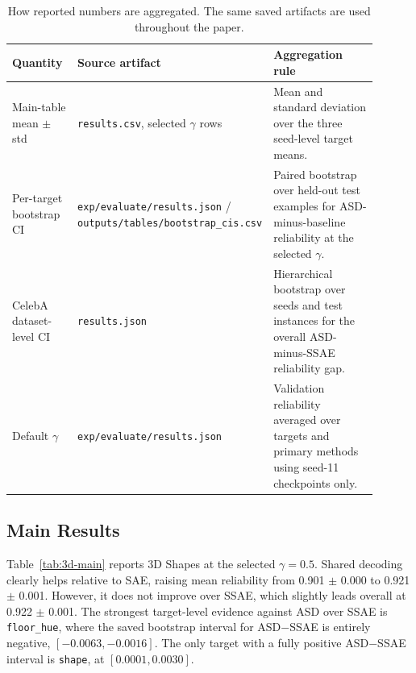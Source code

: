 \documentclass{article}
\begin{document}
\begin{table}[t]
\caption{How reported numbers are aggregated. The same saved artifacts are used throughout the paper.}
\label{tab:aggregation}
\centering
\small
\begin{tabular}{p{0.20\linewidth}p{0.28\linewidth}p{0.42\linewidth}}
\toprule
Quantity & Source artifact & Aggregation rule \\
\midrule
Main-table mean $\pm$ std & \texttt{results.csv}, selected $\gamma$ rows & Mean and standard deviation over the three seed-level target means. \\
Per-target bootstrap CI & \texttt{exp/evaluate/results.json} / \texttt{outputs/tables/bootstrap\_cis.csv} & Paired bootstrap over held-out test examples for ASD-minus-baseline reliability at the selected $\gamma$. \\
CelebA dataset-level CI & \texttt{results.json} & Hierarchical bootstrap over seeds and test instances for the overall ASD-minus-SSAE reliability gap. \\
Default $\gamma$ & \texttt{exp/evaluate/results.json} & Validation reliability averaged over targets and primary methods using seed-11 checkpoints only. \\
\bottomrule
\end{tabular}
\end{table}

\subsection{Main Results}

Table~\ref{tab:3d-main} reports 3D Shapes at the selected $\gamma=0.5$. Shared decoding clearly helps relative to SAE, raising mean reliability from 0.901 $\pm$ 0.000 to 0.921 $\pm$ 0.001. However, it does not improve over SSAE, which slightly leads overall at 0.922 $\pm$ 0.001. The strongest target-level evidence against ASD over SSAE is \texttt{floor\_hue}, where the saved bootstrap interval for ASD$-$SSAE is entirely negative, $[-0.0063,-0.0016]$. The only target with a fully positive ASD$-$SSAE interval is \texttt{shape}, at $[0.0001,0.0030]$.
\end{document}
